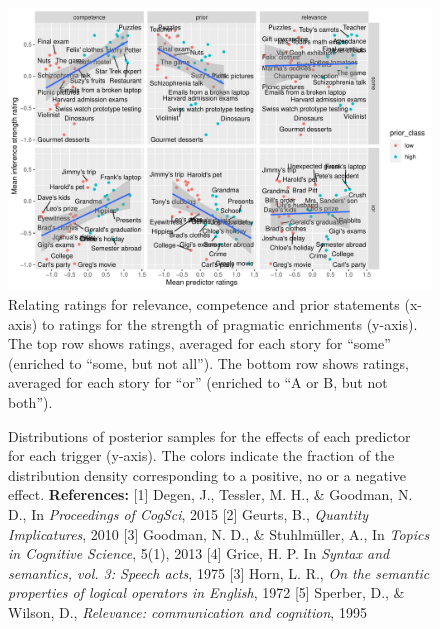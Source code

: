\documentclass[11pt,letterpaper]{article}
\begin{document}
\begin{figure}
  \includegraphics[scale=0.5]{byItem-ratings.pdf}
 \caption{Relating ratings for relevance, competence and prior statements (x-axis) to
ratings for the strength of pragmatic enrichments (y-axis). The top row shows ratings,
averaged for each story for ``some'' (enriched to ``some, but not all''). The bottom row shows ratings, averaged for each story for ``or'' (enriched to ``A or B, but not both'').}
    \label{by-item-ratings}
\end{figure}

\begin{figure}   
    \caption{Distributions of posterior samples for the effects of each predictor for each trigger (y-axis). The colors indicate the fraction of the distribution density corresponding to a positive, no or a negative effect. \newline \textbf{References:} [1] Degen, J., Tessler, M. H., \& Goodman, N. D., In \textit{Proceedings of CogSci}, 2015 [2] Geurts, B., \textit{Quantity Implicatures}, 2010 [3] Goodman, N. D., \& Stuhlm\"uller, A., In \textit{Topics in Cognitive Science}, 5(1), 2013 [4] Grice, H. P. In \textit{Syntax and semantics, vol. 3: Speech acts}, 1975 [3] Horn, L. R., \textit{On the semantic properties of logical operators in English}, 1972 [5] Sperber, D., \& Wilson, D., \textit{Relevance: communication and cognition}, 1995  
    }
    \label{posteriors}
\end{figure}
\end{document}
